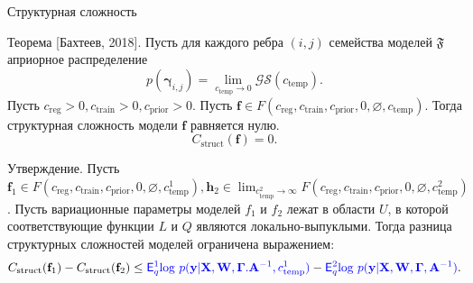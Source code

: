 \documentclass[usenames,dvipsnames,10pt,pdf,utf8,russian,aspectratio=43]{beamer}
\begin{document}
\begin{frame}{Структурная сложность}
\small

\begin{block}{Теорема  [Бахтеев, 2018].}
Пусть для каждого ребра $(i,j)$ семейства моделей $\mathfrak{F}$ априорное распределение $$p(\boldsymbol{\gamma}_{i,j}) =  \lim_{c_{\text{temp}} \to 0} \mathcal{GS}(c_{\text{temp}}).$$
Пусть $c_{\text{reg}} >0, c_{\text{train}} >0, c_{\text{prior}}>0$.
Пусть $\mathbf{f} \in F(c_{\text{reg}}, c_{\text{train}}, c_{\text{prior}}, 0, \varnothing, c_{\text{temp}})$.
Тогда структурная сложность модели $\mathbf{f}$ равняется нулю.
\[
    C_\text{struct}(\mathbf{f}) = 0.
\]
\end{block}

\begin{block}{Утверждение.}
Пусть $\mathbf{f}_1 \in F(c_{\text{reg}}, c_{\text{train}},  c_{\text{prior}}, 0, \varnothing,  c^1_{\text{temp}}), \mathbf{h}_2   \in \lim_{c^2_{\text{temp}} \to \infty} F(c_{\text{reg}}, c_{\text{train}},  c_{\text{prior}}, 0, \varnothing,  c^2_{\text{temp}})$.
Пусть вариационные параметры моделей $f_1$ и $f_2$ лежат в области $U$, в которой соответствующие функции $L$ и $Q$ являются локально-выпуклыми. 
Тогда разница структурных сложностей моделей ограничена выражением:
\[
    C_\text{struct}(\mathbf{f}_1)  - C_\text{struct}(\mathbf{f}_2) \leq \textcolor{blue}{\mathsf{E}_q^1 \text{log}~{p(\mathbf{y} | \mathbf{X}, \mathbf{W}, \boldsymbol{\Gamma}. \mathbf{A}^{-1}, c^1_{\text{temp}})}} - \textcolor{blue}{\mathsf{E}_q^2 \text{log}~{p(\mathbf{y} | \mathbf{X}, \mathbf{W}, \boldsymbol{\Gamma}, \mathbf{A}^{-1})}}.
\]
\end{block}

\end{frame}
\end{document}
